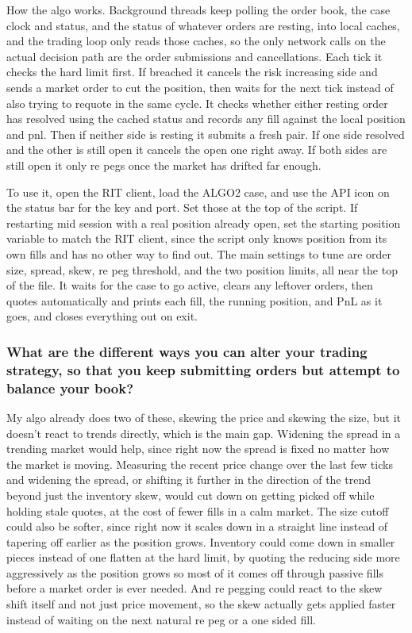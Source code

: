 \documentclass{article}
\begin{document}
How the algo works. Background threads keep polling the order book, the case clock and status, and the status of whatever orders are resting, into local caches, and the trading loop only reads those caches, so the only network calls on the actual decision path are the order submissions and cancellations. Each tick it checks the hard limit first. If breached it cancels the risk increasing side and sends a market order to cut the position, then waits for the next tick instead of also trying to requote in the same cycle. It checks whether either resting order has resolved using the cached status and records any fill against the local position and pnl. Then if neither side is resting it submits a fresh pair. If one side resolved and the other is still open it cancels the open one right away. If both sides are still open it only re pegs once the market has drifted far enough.

To use it, open the RIT client, load the ALGO2 case, and use the API icon on the status bar for the key and port. Set those at the top of the script. If restarting mid session with a real position already open, set the starting position variable to match the RIT client, since the script only knows position from its own fills and has no other way to find out. The main settings to tune are order size, spread, skew, re peg threshold, and the two position limits, all near the top of the file. It waits for the case to go active, clears any leftover orders, then quotes automatically and prints each fill, the running position, and PnL as it goes, and closes everything out on exit.

\subsubsection{What are the different ways you can alter your trading strategy, so that you keep submitting orders but attempt to balance your book?}
My algo already does two of these, skewing the price and skewing the size, but it doesn’t react to trends directly, which is the main gap. Widening the spread in a trending market would help, since right now the spread is fixed no matter how the market is moving. Measuring the recent price change over the last few ticks and widening the spread, or shifting it further in the direction of the trend beyond just the inventory skew, would cut down on getting picked off while holding stale quotes, at the cost of fewer fills in a calm market. The size cutoff could also be softer, since right now it scales down in a straight line instead of tapering off earlier as the position grows. Inventory could come down in smaller pieces instead of one flatten at the hard limit, by quoting the reducing side more aggressively as the position grows so most of it comes off through passive fills before a market order is ever needed. And re pegging could react to the skew shift itself and not just price movement, so the skew actually gets applied faster instead of waiting on the next natural re peg or a one sided fill.
\end{document}
